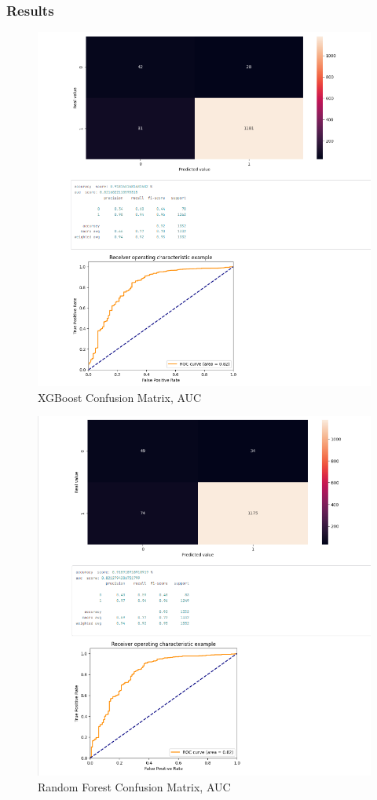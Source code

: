 \documentclass[a4paper,12pt,twoside]{report}
\begin{document}
\subsubsection{Results}
\begin{figure}[H]
		\includegraphics[width=\textwidth]{images/xgboost}
	\caption[XGBoost Confusion Matrix, AUC]{XGBoost Confusion Matrix, AUC}
\label{xgboost}
\end{figure}
\begin{figure}[H]
		\includegraphics[width=\textwidth]{images/randomforest}
	\caption[Random Forest Confusion Matrix, AUC]{Random Forest Confusion Matrix, AUC}
\label{randomfor}
\end{figure}
\end{document}
